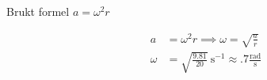 \subsubsection{}

Brukt formel $a = \omega^2 r$

\begin{align}
a &= \omega^2 r \implies \omega = \sqrt{\frac{a}{r}} \\[2mm]
\omega &= \sqrt{\frac{9.81}{20}} \ \mathrm{s^{-1}} \approx .7 \mathrm{\frac{rad}{s}}
\end{align}

\newpage